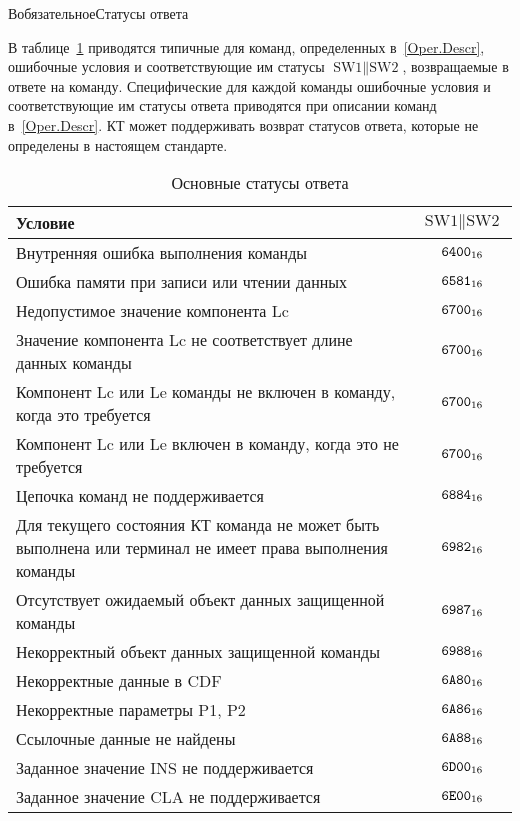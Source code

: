 \begin{appendix}{В}{обязательное}{Статусы ответа}
\label{ERRORS}

В таблице~\ref{Table.Errors.General} приводятся типичные для команд, 
определенных в~\ref{Oper.Descr},
ошибочные условия и соответствующие им 
статусы $\text{SW1} \parallel \text{SW2}$,
возвращаемые в ответе на команду.
Специфические для каждой команды ошибочные условия и соответствующие
им статусы ответа приводятся 
при описании команд в~\ref{Oper.Descr}.
КТ может поддерживать возврат статусов ответа,
которые не определены в настоящем стандарте.

\begin{table}[hbt]
\caption{Основные статусы ответа}
\label{Table.Errors.General}
\begin{tabular}{|p{14cm}|c|}
\hline
Условие & $\text{SW1} \parallel \text{SW2}$\\
\hline
\hline
Внутренняя ошибка выполнения команды & $\texttt{6400}_{16}$ \\
\hline
Ошибка памяти при записи или чтении данных & $\texttt{6581}_{16}$ \\
\hline
Недопустимое значение компонента Lc & $\texttt{6700}_{16}$ \\
\hline
Значение компонента Lc не соответствует длине данных команды& $\texttt{6700}_{16}$ \\
\hline
Компонент Lc или Le команды не включен в команду, 
когда это требуется& $\texttt{6700}_{16}$ \\
\hline
Компонент Lc или Le включен в команду, 
когда это не требуется& $\texttt{6700}_{16}$ \\
\hline
Цепочка команд не поддерживается & $\texttt{6884}_{16}$ \\
\hline
Для текущего состояния КТ команда не может быть выполнена
или терминал не имеет права выполнения команды & $\texttt{6982}_{16}$ \\
\hline
Отсутствует ожидаемый объект данных защищенной 
команды & $\texttt{6987}_{16}$ \\
\hline
Некорректный объект данных защищенной команды & $\texttt{6988}_{16}$ \\
\hline
Некорректные данные в CDF & $\texttt{6A80}_{16}$ \\
\hline
Некорректные параметры P1, P2 & $\texttt{6A86}_{16}$ \\
\hline
Ссылочные данные не найдены & $\texttt{6A88}_{16}$ \\
\hline
Заданное значение INS не поддерживается & $\texttt{6D00}_{16}$ \\
\hline
Заданное значение CLA не поддерживается & $\texttt{6E00}_{16}$ \\
\hline
\end{tabular}
\end{table}

\mbox{}
\vfill
\mbox{}
\clearpage

\end{appendix}